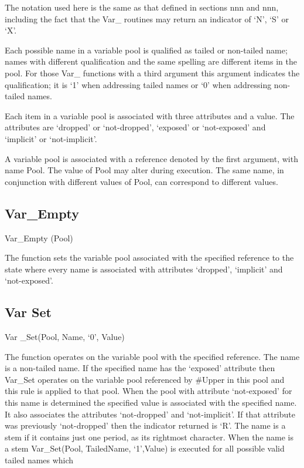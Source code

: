 The notation used here is the same as that defined in sections nnn and
nnn, including the fact that the Var\_ routines may return an indicator
of `N', `S' or `X'.

Each possible name in a variable pool is qualified as tailed or
non-tailed name; names with different qualification and the same
spelling are different items in the pool. For those Var\_ functions with
a third argument this argument indicates the qualification; it is `1'
when addressing tailed names or `0' when addressing non-tailed names.

Each item in a variable pool is associated with three attributes and a
value. The attributes are `dropped' or `not-dropped', `exposed' or
`not-exposed' and `implicit' or `not-implicit'.

A variable pool is associated with a reference denoted by the first
argument, with name Pool. The value of Pool may alter during execution.
The same name, in conjunction with different values of Pool, can
correspond to different values.

\hypertarget{var_empty}{%
\subsection{Var\_Empty}\label{var_empty}}

Var\_Empty (Pool)

The function sets the variable pool associated with the specified
reference to the state where every name is associated with attributes
`dropped', `implicit' and `not-exposed'.

\hypertarget{var-set}{%
\subsection{Var Set}\label{var-set}}

Var \_Set(Pool, Name, `0', Value)

The function operates on the variable pool with the specified reference.
The name is a non-tailed name. If the specified name has the `exposed'
attribute then Var\_Set operates on the variable pool referenced by
\#Upper in this pool and this rule is applied to that pool. When the
pool with attribute `not-exposed' for this name is determined the
specified value is associated with the specified name. It also
associates the attributes `not-dropped' and `not-implicit'. If that
attribute was previously `not-dropped' then the indicator returned is
`R'. The name is a stem if it contains just one period, as its rightmost
character. When the name is a stem Var\_Set(Pool, TailedName, `1',Value)
is executed for all possible valid tailed names which

